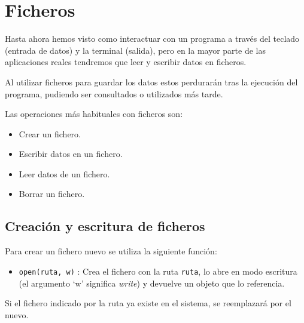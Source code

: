\documentclass[
  spanish,
  a4paper,
]{scrreport}
\providecommand{\tightlist}{%
  \setlength{\itemsep}{0pt}\setlength{\parskip}{0pt}}
\begin{document}

\chapter{Ficheros}\label{ficheros}

Hasta ahora hemos visto como interactuar con un programa a través del
teclado (entrada de datos) y la terminal (salida), pero en la mayor
parte de las aplicaciones reales tendremos que leer y escribir datos en
ficheros.

Al utilizar ficheros para guardar los datos estos perdurarán tras la
ejecución del programa, pudiendo ser consultados o utilizados más tarde.

Las operaciones más habituales con ficheros son:

\begin{itemize}
\tightlist
\item
  Crear un fichero.
\item
  Escribir datos en un fichero.
\item
  Leer datos de un fichero.
\item
  Borrar un fichero.
\end{itemize}

\section{Creación y escritura de
ficheros}\label{creaciuxf3n-y-escritura-de-ficheros}

Para crear un fichero nuevo se utiliza la siguiente función:

\begin{itemize}
\tightlist
\item
  \texttt{open(ruta,\ \textquotesingle{}w\textquotesingle{})} : Crea el
  fichero con la ruta \texttt{ruta}, lo abre en modo escritura (el
  argumento `w' significa \emph{write}) y devuelve un objeto que lo
  referencia.
\end{itemize}

\begin{tcolorbox}[enhanced jigsaw, arc=.35mm, bottomrule=.15mm, bottomtitle=1mm, breakable, colback=white, colbacktitle=quarto-callout-warning-color!10!white, colframe=quarto-callout-warning-color-frame, coltitle=black, left=2mm, leftrule=.75mm, opacityback=0, opacitybacktitle=0.6, rightrule=.15mm, title=\textcolor{quarto-callout-warning-color}{\faExclamationTriangle}\hspace{0.5em}{Advertencia}, titlerule=0mm, toprule=.15mm, toptitle=1mm]

Si el fichero indicado por la ruta ya existe en el sistema, se
reemplazará por el nuevo.

\end{tcolorbox}
\end{document}

